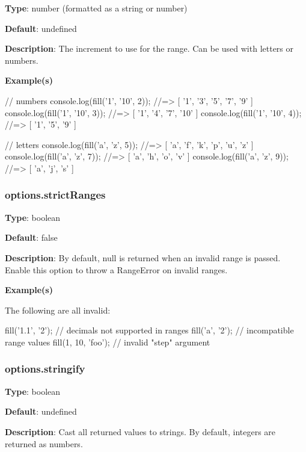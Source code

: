 {\bfseries Type}\+: {\ttfamily number} (formatted as a string or number)

{\bfseries Default}\+: {\ttfamily undefined}

{\bfseries Description}\+: The increment to use for the range. Can be used with letters or numbers.

{\bfseries Example(s)}


\begin{DoxyCode}
// numbers
console.log(fill('1', '10', 2)); //=> [ '1', '3', '5', '7', '9' ]
console.log(fill('1', '10', 3)); //=> [ '1', '4', '7', '10' ]
console.log(fill('1', '10', 4)); //=> [ '1', '5', '9' ]

// letters
console.log(fill('a', 'z', 5)); //=> [ 'a', 'f', 'k', 'p', 'u', 'z' ]
console.log(fill('a', 'z', 7)); //=> [ 'a', 'h', 'o', 'v' ]
console.log(fill('a', 'z', 9)); //=> [ 'a', 'j', 's' ]
\end{DoxyCode}


\subsubsection*{options.\+strict\+Ranges}

{\bfseries Type}\+: {\ttfamily boolean}

{\bfseries Default}\+: {\ttfamily false}

{\bfseries Description}\+: By default, {\ttfamily null} is returned when an invalid range is passed. Enable this option to throw a {\ttfamily Range\+Error} on invalid ranges.

{\bfseries Example(s)}

The following are all invalid\+:


\begin{DoxyCode}
fill('1.1', '2');   // decimals not supported in ranges
fill('a', '2');     // incompatible range values
fill(1, 10, 'foo'); // invalid "step" argument
\end{DoxyCode}


\subsubsection*{options.\+stringify}

{\bfseries Type}\+: {\ttfamily boolean}

{\bfseries Default}\+: {\ttfamily undefined}

{\bfseries Description}\+: Cast all returned values to strings. By default, integers are returned as numbers.

